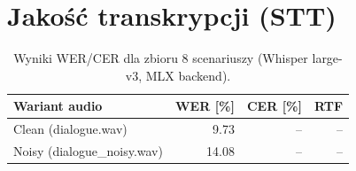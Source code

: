 %
%
%
%
%

\section{Jakość transkrypcji (STT)}\label{sec:ewaluacja-stt}

%
%
%

\begin{table}[htbp]
  \centering
  \caption{Wyniki WER/CER dla zbioru 8 scenariuszy
           (Whisper large-v3, MLX backend).}
  \label{tab:wer}
  \begin{tabular}{lrrr}
    \toprule
    Wariant audio & WER [\%] & CER [\%] & RTF \\
    \midrule
    Clean (dialogue.wav)       & 9.73 & -- & -- \\
    Noisy (dialogue\_noisy.wav) & 14.08 & -- & -- \\
    \bottomrule
  \end{tabular}
\end{table}

